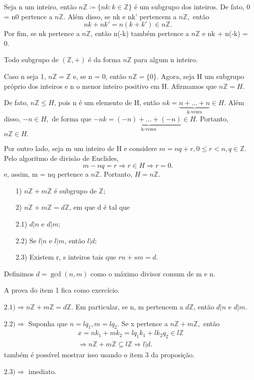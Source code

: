\documentclass[Algebra/algebra_notes.tex]{subfiles}
\begin{document}
\begin{example*}
	Seja n um inteiro, então $n\mathbb{Z}\coloneqq \{nk: k\in \mathbb{Z}\}$ é um subgrupo dos inteiros. De fato, 0 = n0 pertence
	a $n\mathbb{Z}.$ Além disso, se nk e nk' pertencem a $n\mathbb{Z},$ então
	$$
		nk + nk' = n(k + k')\in n \mathbb{Z}.
	$$
	Por fim, se nk pertence a $ n\mathbb{Z}$, então n(-k) também pertence a $n \mathbb{Z}$ e nk + n(-k) = 0. \qedsymbol
\end{example*}
\begin{prop*}
	Todo subgrupo de $(\mathbb{Z}, +)$ é da forma $n \mathbb{Z}$ para algum n inteiro.
\end{prop*}
\begin{proof*}
	Caso n seja 1, $n \mathbb{Z} = \mathbb{Z}$ e, se n = 0, então $n \mathbb{Z} = \{0\}. $ Agora, seja H um subgrupo próprio dos
	inteiros e n o menor inteiro positivo em H. Afirmamos que $n \mathbb{Z} = H$.

	De fato, $n \mathbb{Z} \leq{H}$, pois n é um elemento de H, então $nk = \underbrace{n + \ldots + n}_{\text{k-vezes}} \in H$. Além disso, $-n\in H,$ de forma
	que $-nk = \underbrace{(-n) + \ldots + (-n)}_{\text{k-vezes}}\in H.$ Portanto, $n \mathbb{Z}\in H.$

	Por outro lado, seja m um inteiro de H e considere $m = nq + r, 0 \leq{r} < n, q\in \mathbb{Z}.$ Pelo algoritmo de divisão de Euclides,
	$$
		m - nq = r \Rightarrow r\in H\Rightarrow r = 0.
	$$
	e, assim, m = nq pertence a $n\mathbb{Z}$. Portanto, $H = n \mathbb{Z}$. \qedsymbol
\end{proof*}
\begin{prop*}
	\begin{itemize}
		\item[1)] $n \mathbb{Z} + m \mathbb{Z}$ é subgrupo de $\mathbb{Z};$
		\item[2)] $n \mathbb{Z} + m \mathbb{Z} = d \mathbb{Z}$, em que d é tal que
		\item[2.1)] $d | n$ e $d | m$;
		\item[2.2)] Se $l | n$ e $l | m$, então $l | d;$
		\item[2.3)] Existem r, s inteiros tais que $rn + sm = d.$
	\end{itemize}
	Definimos $d = \gcd{(n, m)}$ como o máximo divisor comum de m e n.
\end{prop*}
\begin{proof*}
	A prova do item 1 fica como exercício.

	$2.1)\Rightarrow n \mathbb{Z} + m \mathbb{Z} = d \mathbb{Z}.$ Em particular, se n, m pertencem a $d \mathbb{Z}$, então
	$d | n \text{ e } d | m.$

	$2.2)\Rightarrow$ Suponha que $n = lq_{1}, m = lq_{2} $. Se x pertence a $n \mathbb{Z} + m \mathbb{Z},$ então
	\begin{align*}
		 & x = nk_{1} + mk_{2} = lq_{1}k_{1} + lk_{2}q_{2} \in l \mathbb{Z}                   \\
		 & \Rightarrow n \mathbb{Z} + m \mathbb{Z} \subseteq{l \mathbb{Z}} \Rightarrow l | d.
	\end{align*}
	também é possível mostrar isso usando o item 3 da proposição.

	$2.3)\Rightarrow$ imediato. \qedsymbol
\end{proof*}
\end{document}
